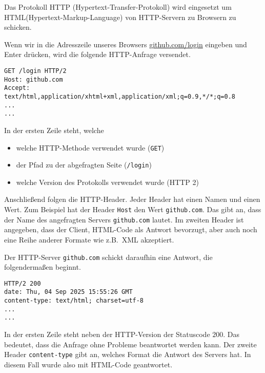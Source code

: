 \documentclass[a4paper]{scrartcl}
\begin{document}
Das Protokoll HTTP (Hypertext-Transfer-Protokoll) wird eingesetzt um HTML(Hypertext-Markup-Language) von HTTP-Servern zu Browsern zu schicken.



Wenn wir in die Adresszeile unseres Browsers \url{github.com/login}  eingeben und Enter drücken, wird die folgende HTTP-Anfrage versendet.

\begin{Verbatim}[label={verb:verbatim2}]
GET /login HTTP/2
Host: github.com
Accept: text/html,application/xhtml+xml,application/xml;q=0.9,*/*;q=0.8
...
...
\end{Verbatim}

In der ersten Zeile steht, welche
\begin{itemize}
\item  welche HTTP-Methode verwendet wurde (\texttt{GET})
\item  der Pfad zu der abgefragten Seite (\texttt{/login})
\item  welche Version des Protokolls verwendet wurde (HTTP 2)

\end{itemize}

 



Anschließend folgen die HTTP-Header.
Jeder Header hat einen Namen und einen Wert.
Zum Beispiel hat der Header \texttt{Host} den Wert \texttt{github.com}.
Das gibt an, dass der Name des angefragten Servers \texttt{github.com} lautet.
Im zweiten Header ist angegeben, dass der Client, HTML-Code als Antwort bevorzugt, aber auch noch eine Reihe anderer Formate wie z.B.\ XML akzeptiert.

Der HTTP-Server \texttt{github.com} schickt daraufhin eine Antwort, die folgendermaßen beginnt.
\begin{Verbatim}[label={verb:verbatim3}]
HTTP/2 200 
date: Thu, 04 Sep 2025 15:55:26 GMT
content-type: text/html; charset=utf-8
...
...
\end{Verbatim}

In der ersten Zeile steht neben der HTTP-Version der Statuscode $200$.
Das bedeutet, dass die Anfrage ohne Probleme beantwortet werden kann.
Der zweite Header \texttt{content-type} gibt an, welches Format die Antwort des Servers hat.
In diesem Fall wurde also mit HTML-Code geantwortet.
\end{document}
